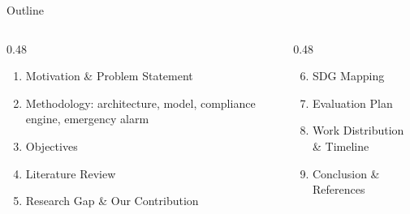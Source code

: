 \documentclass[aspectratio=169,10pt]{beamer}
\begin{document}
\begin{frame}{Outline}
  \begin{columns}[T]
    \begin{column}{0.48\textwidth}
      \begin{enumerate}
        \item Motivation \& Problem Statement
        \item Methodology: architecture, model, compliance engine, emergency alarm
        \item Objectives
        \item Literature Review
        \item Research Gap \& Our Contribution
      \end{enumerate}
    \end{column}
    \begin{column}{0.48\textwidth}
      \begin{enumerate}\setcounter{enumi}{5}
        \item SDG Mapping
        \item Evaluation Plan
        \item Work Distribution \& Timeline
        \item Conclusion \& References
      \end{enumerate}
    \end{column}
  \end{columns}
\end{frame}
\end{document}
